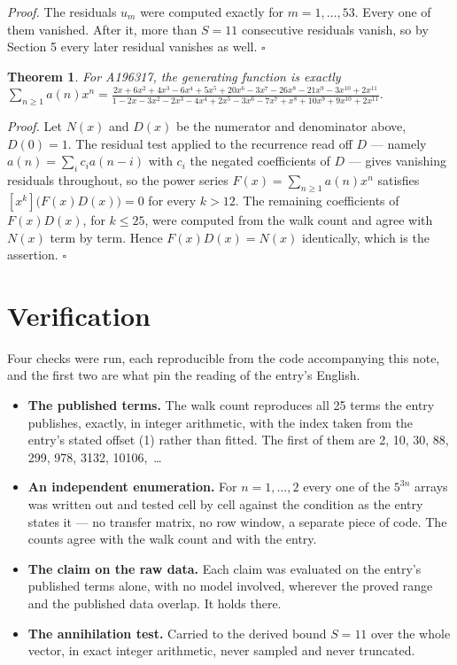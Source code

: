 \documentclass[11pt]{article}
\newtheorem{theorem}{Theorem}
\theoremstyle{definition}
\begin{document}
{\itshape Proof.} The residuals $u_m$ were computed exactly for $m = 1,\dots,53$. Every one of them vanished. After it, more than $S = 11$ consecutive residuals vanish, so by Section 5 every later residual vanishes as well. $\square$

\begin{theorem} For A196317, the generating function is exactly $\sum_{n\ge 1} a(n)x^n = \frac{2x + 6x^{2} + 4x^{3} - 6x^{4} + 5x^{5} + 20x^{6} - 3x^{7} - 26x^{8} - 21x^{9} - 3x^{10} + 2x^{11}}{1 - 2x - 3x^{2} - 2x^{3} - 4x^{4} + 2x^{5} - 3x^{6} - 7x^{7} + x^{8} + 10x^{9} + 9x^{10} + 2x^{11}}$.\end{theorem}

{\itshape Proof.} Let $N(x)$ and $D(x)$ be the numerator and denominator above, $D(0)=1$. The residual test applied to the recurrence read off $D$ --- namely $a(n) = \sum_i c_i a(n-i)$ with $c_i$ the negated coefficients of $D$ --- gives vanishing residuals throughout, so the power series $F(x)=\sum_{n\ge 1}a(n)x^n$ satisfies $[x^k]\bigl(F(x)D(x)\bigr) = 0$ for every $k > 12$. The remaining coefficients of $F(x)D(x)$, for $k \le 25$, were computed from the walk count and agree with $N(x)$ term by term. Hence $F(x)D(x) = N(x)$ identically, which is the assertion. $\square$

\section{Verification}

Four checks were run, each reproducible from the code accompanying this note, and the first two are what pin the reading of the entry's English.

\begin{itemize}

\item {\bfseries The published terms.} The walk count reproduces all 25 terms the entry publishes, exactly, in integer arithmetic, with the index taken from the entry's stated offset (1) rather than fitted. The first of them are 2, 10, 30, 88, 299, 978, 3132, 10106,~\dots

\item {\bfseries An independent enumeration.} For $n = 1,\dots,2$ every one of the $5^{3n}$ arrays was written out and tested cell by cell against the condition as the entry states it --- no transfer matrix, no row window, a separate piece of code. The counts agree with the walk count and with the entry.

\item {\bfseries The claim on the raw data.} Each claim was evaluated on the entry's published terms alone, with no model involved, wherever the proved range and the published data overlap. It holds there.

\item {\bfseries The annihilation test.} Carried to the derived bound $S = 11$ over the whole vector, in exact integer arithmetic, never sampled and never truncated.

\end{itemize}
\end{document}
